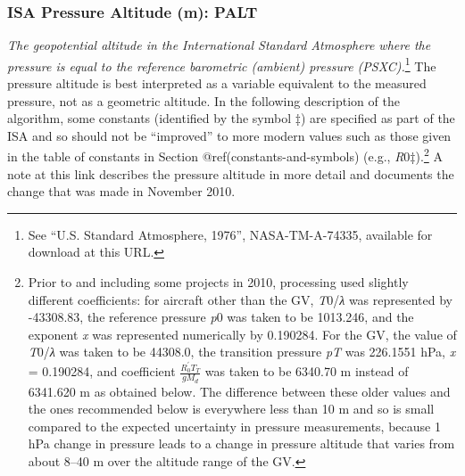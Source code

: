 \documentclass[
  english,
]{book}
\begin{document}
\hypertarget{palt}{%
\subsubsection*{ISA Pressure Altitude (m): PALT}\label{palt}}

\emph{The geopotential altitude in the International Standard Atmosphere
where the pressure is equal to the reference barometric (ambient)
pressure (PSXC).}\footnote{See ``U.S. Standard Atmosphere, 1976'',
  NASA-TM-A-74335, available for download at this URL.} The pressure
altitude is best interpreted as a variable equivalent to the measured
pressure, not as a geometric altitude. In the following description of
the algorithm, some constants (identified by the symbol {‡}) are
specified as part of the ISA and so should not be ``improved'' to more
modern values such as those given in the table of constants in Section
@ref(constants-and-symbols) (e.g., {\emph{R}0‡).}\footnote{Prior to and
  including some projects in 2010, processing used slightly different
  coefficients: for aircraft other than the GV, {\emph{T}0/\emph{λ}} was
  represented by -43308.83, the reference pressure {\emph{p}0} was taken
  to be 1013.246, and the exponent {\emph{x}} was represented
  numerically by 0.190284. For the GV, the value of {\emph{T}0/\emph{λ}}
  was taken to be 44308.0, the transition pressure {\emph{p}\emph{T}}
  was 226.1551 hPa, {\emph{x}} = 0.190284, and coefficient
  {\(\frac{R_{0}^{\prime}T_{T}}{gM_{d}}\)} was taken to be 6340.70 m
  instead of 6341.620 m as obtained below. The difference between these
  older values and the ones recommended below is everywhere less than 10
  m and so is small compared to the expected uncertainty in pressure
  measurements, because 1 hPa change in pressure leads to a change in
  pressure altitude that varies from about 8--40 m over the altitude
  range of the GV.} A note at this link describes the pressure altitude
in more detail and documents the change that was made in November 2010.
\end{document}

